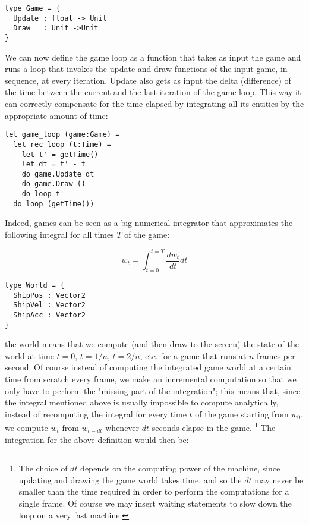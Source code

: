 \begin{lstlisting}
type Game = {
  Update : float -> Unit
  Draw   : Unit ->Unit
}
\end{lstlisting}

We can now define the game loop as a function that takes as input the game and runs a loop that invokes the update and draw functions of the input game, in sequence, at every iteration. Update also gets as input the delta (difference) of the time between the current and the last iteration of the game loop. This way it can correctly compensate for the time elapsed by integrating all its entities by the appropriate amount of time:

\begin{lstlisting}
let game_loop (game:Game) =
  let rec loop (t:Time) =
    let t' = getTime()
    let dt = t' - t
    do game.Update dt
    do game.Draw ()
    do loop t' 
  do loop (getTime())
\end{lstlisting}

Indeed, games can be seen as a big numerical integrator that approximates the following integral for all times $T$ of the game:

$$w_t = \int_{t=0}^{t=T} \frac{dw_t}{dt}dt$$


\begin{lstlisting}
type World = { 
  ShipPos : Vector2
  ShipVel : Vector2 
  ShipAcc : Vector2
}
\end{lstlisting}

 the world means that we compute (and then draw to the screen) the state of the world at time $t=0$, $t=1/n$, $t=2/n$, etc. for a game that runs at $n$ frames per second. Of course instead of computing the integrated game world at a certain time from scratch every frame, we make an incremental computation so that we only have to perform the "missing part of the integration"; this means that, since the integral mentioned above is usually impossible to compute analytically, instead of recomputing the integral for every time $t$ of the game starting from $w_0$, we compute $w_t$ from $w_{t-dt}$ whenever $dt$ seconds elapse in the game. \footnote{The choice of $dt$ depends on the computing power of the machine, since updating and drawing the game world takes time, and so the $dt$ may never be smaller than the time required in order to perform the computations for a single frame. Of course we may insert waiting statements to slow down the loop on a very fast machine.} The integration for the above definition would then be:

